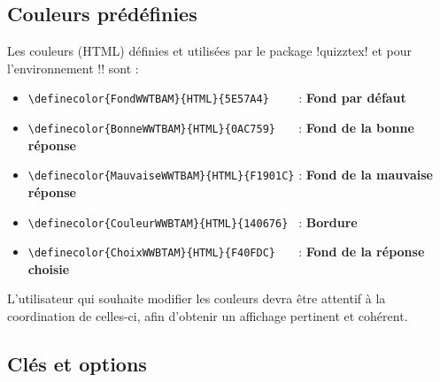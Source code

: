 \documentclass[french,a4paper,11pt]{article}
\begin{document}
\subsection{Couleurs prédéfinies}

\begin{tipblock}
Les couleurs (HTML) définies et utilisées par le package \packagetex!quizztex! et pour l'environnement \motcletex!\QuizzMillions! sont :

\begin{itemize}
	\item \verb!\definecolor{FondWWTBAM}{HTML}{5E57A4}    ! : \textcolor{FondWWTBAM}{\textsf{\textbf{Fond par défaut}}}
	\item \verb!\definecolor{BonneWWTBAM}{HTML}{0AC759}   ! : \textcolor{BonneWWTBAM}{\textsf{\textbf{Fond de la bonne réponse}}}
	\item \verb!\definecolor{MauvaiseWWTBAM}{HTML}{F1901C}! : \textcolor{MauvaiseWWTBAM}{\textsf{\textbf{Fond de la mauvaise réponse}}}
	\item \verb!\definecolor{CouleurWWBTAM}{HTML}{140676} ! : \textcolor{CouleurWWBTAM}{\textsf{\textbf{Bordure}}}
	\item \verb!\definecolor{ChoixWWBTAM}{HTML}{F40FDC}   ! : \textcolor{ChoixWWBTAM}{\textsf{\textbf{Fond de la réponse choisie}}}
\end{itemize}

L'utilisateur qui souhaite modifier les couleurs devra être attentif à la coordination de celles-ci, afin d'obtenir un affichage pertinent et cohérent.
\end{tipblock}

\begin{DemoCode}[]
\QuizzMillions{\lipsum[1][1-2]}
	{\lipsum[2][1]}{\lipsum[2][2]}{\lipsum[2][3]}{\lipsum[2][5]}
\end{DemoCode}

\subsection{Clés et options}
\end{document}

